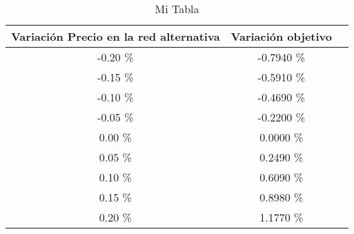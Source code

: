 \begin{table}
\centering
\begin{tabular}{|c|c|c|}
\hline
 Variación Precio en la red alternativa & Variación objetivo \\ \hline
-0.20 \% & -0.7940 \% \\ \hline
-0.15 \% & -0.5910 \% \\ \hline
-0.10 \% & -0.4690 \% \\ \hline
-0.05 \% & -0.2200 \% \\ \hline
0.00 \% & 0.0000 \% \\ \hline
0.05 \% & 0.2490 \% \\ \hline
0.10 \% & 0.6090 \% \\ \hline
0.15 \% & 0.8980 \% \\ \hline
0.20 \% & 1.1770 \% \\ \hline
\end{tabular}
\caption{Mi Tabla}
\end{table}
